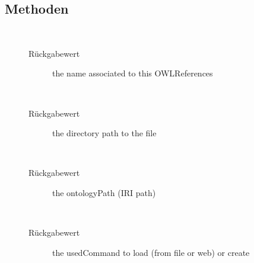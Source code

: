 \subsection{Methoden}
\begin{description}
\item[{\label{ontologyFramework.OFContextManagement.OWLReferencesSerializable.getOntoName()}}]
~ 
\begin{description}
\item[Rückgabewert] 
the name associated to this OWLReferences
\end{description}
\item[{\label{ontologyFramework.OFContextManagement.OWLReferencesSerializable.getFilePath()}}]
~ 
\begin{description}
\item[Rückgabewert] 
the directory path to the file
\end{description}
\item[{\label{ontologyFramework.OFContextManagement.OWLReferencesSerializable.getOntologyPath()}}]
~ 
\begin{description}
\item[Rückgabewert] 
the ontologyPath (IRI path)
\end{description}
\item[{\label{ontologyFramework.OFContextManagement.OWLReferencesSerializable.getUsedCommand()}}]
~ 
\begin{description}
\item[Rückgabewert] 
the usedCommand to load (from file or web) or create
\end{description}
\end{description}
